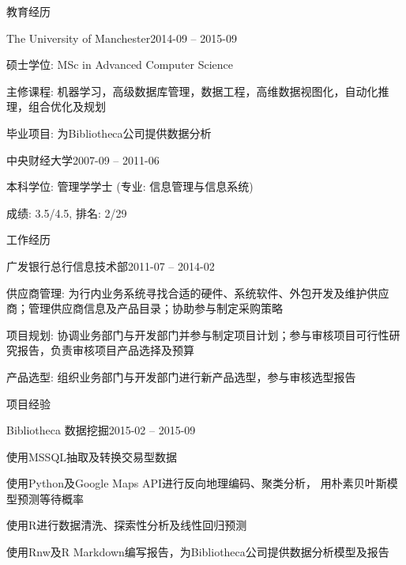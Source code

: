 \documentclass{resume} %
\begin{document}

\begin{rSection}{教育经历}

\begin{rSubsection}{The University of Manchester}{2014-09 -- 2015-09}{}{}
    \item 硕士学位: MSc in Advanced Computer Science 
    \item 主修课程: 机器学习，高级数据库管理，数据工程，高维数据视图化，自动化推理，组合优化及规划
    \item 毕业项目: 为Bibliotheca公司提供数据分析
\end{rSubsection}

\begin{rSubsection}{中央财经大学}{2007-09 -- 2011-06}{}{}  
    \item 本科学位: 管理学学士 (专业: 信息管理与信息系统)
    \item 成绩: 3.5/4.5, 排名: 2/29
\end{rSubsection}

\end{rSection}


\begin{rSection}{工作经历}

\begin{rSubsection}{广发银行总行信息技术部}{2011-07 -- 2014-02}{}{}
\item 供应商管理: 为行内业务系统寻找合适的硬件、系统软件、外包开发及维护供应商；管理供应商信息及产品目录；协助参与制定采购策略
\item 项目规划: 协调业务部门与开发部门并参与制定项目计划；参与审核项目可行性研究报告，负责审核项目产品选择及预算
\item 产品选型: 组织业务部门与开发部门进行新产品选型，参与审核选型报告
\end{rSubsection}

\end{rSection}


\begin{rSection}{项目经验}
\begin{rSubsection}{Bibliotheca 数据挖掘}{2015-02 -- 2015-09}{}{}
\item 使用MSSQL抽取及转换交易型数据
\item 使用Python及Google Maps API进行反向地理编码、聚类分析， 用朴素贝叶斯模型预测等待概率
\item 使用R进行数据清洗、探索性分析及线性回归预测
\item 使用Rnw及R Markdown编写报告，为Bibliotheca公司提供数据分析模型及报告
\end{rSubsection}
\end{rSection}
\end{document}
